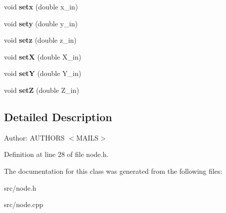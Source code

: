 \begin{CompactItemize}
\item 
\hypertarget{classmknix_1_1Node_b9e70316fb81d733fed68dc0ce9e3104}{
void \textbf{setx} (double x\_\-in)}
\label{classmknix_1_1Node_b9e70316fb81d733fed68dc0ce9e3104}

\item 
\hypertarget{classmknix_1_1Node_cd378f389e87b0711acec44969249696}{
void \textbf{sety} (double y\_\-in)}
\label{classmknix_1_1Node_cd378f389e87b0711acec44969249696}

\item 
\hypertarget{classmknix_1_1Node_592df726bbac32dd5ed5a5e1cd378f6f}{
void \textbf{setz} (double z\_\-in)}
\label{classmknix_1_1Node_592df726bbac32dd5ed5a5e1cd378f6f}

\item 
\hypertarget{classmknix_1_1Node_ac32e597e1ec0bb85fabcbd2f14d0348}{
void \textbf{setX} (double X\_\-in)}
\label{classmknix_1_1Node_ac32e597e1ec0bb85fabcbd2f14d0348}

\item 
\hypertarget{classmknix_1_1Node_cd17b4ac110feaa43430839b6aad107b}{
void \textbf{setY} (double Y\_\-in)}
\label{classmknix_1_1Node_cd17b4ac110feaa43430839b6aad107b}

\item 
\hypertarget{classmknix_1_1Node_a294c096ab343766756ca8e5c6ec7f26}{
void \textbf{setZ} (double Z\_\-in)}
\label{classmknix_1_1Node_a294c096ab343766756ca8e5c6ec7f26}

\end{CompactItemize}


\subsection{Detailed Description}
\begin{Desc}
\item[Author:]AUTHORS $<$MAILS$>$ \end{Desc}


Definition at line 28 of file node.h.

The documentation for this class was generated from the following files:\begin{CompactItemize}
\item 
src/node.h\item 
src/node.cpp\end{CompactItemize}

